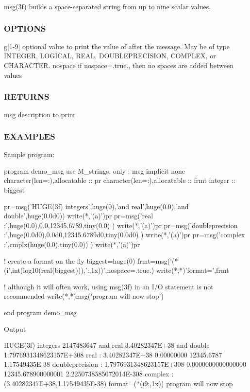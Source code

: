 msg(3f) builds a space-\/separated string from up to nine scalar values.

\subsubsection*{O\+P\+T\+I\+O\+NS}

g\mbox{[}1-\/9\mbox{]} optional value to print the value of after the message. May be of type I\+N\+T\+E\+G\+ER, L\+O\+G\+I\+C\+AL, R\+E\+AL, D\+O\+U\+B\+L\+E\+P\+R\+E\+C\+I\+S\+I\+ON, C\+O\+M\+P\+L\+EX, or C\+H\+A\+R\+A\+C\+T\+ER. nospace if nospace=.true., then no spaces are added between values \subsubsection*{R\+E\+T\+U\+R\+NS}

msg description to print

\subsubsection*{E\+X\+A\+M\+P\+L\+ES}

Sample program\+: \begin{DoxyVerb} program demo_msg
 use M_strings, only : msg
 implicit none
 character(len=:),allocatable :: pr
 character(len=:),allocatable :: frmt
 integer                      :: biggest

 pr=msg('HUGE(3f) integers',huge(0),'and real',huge(0.0),'and double',huge(0.0d0))
 write(*,'(a)')pr
 pr=msg('real            :',huge(0.0),0.0,12345.6789,tiny(0.0) )
 write(*,'(a)')pr
 pr=msg('doubleprecision :',huge(0.0d0),0.0d0,12345.6789d0,tiny(0.0d0) )
 write(*,'(a)')pr
 pr=msg('complex         :',cmplx(huge(0.0),tiny(0.0)) )
 write(*,'(a)')pr

 ! create a format on the fly
 biggest=huge(0)
 frmt=msg('(*(i',int(log10(real(biggest))),':,1x))',nospace=.true.)
 write(*,*)'format=',frmt

 ! although it will often work, using msg(3f) in an I/O statement is not recommended
 write(*,*)msg('program will now stop')

 end program demo_msg
\end{DoxyVerb}


Output \begin{DoxyVerb}HUGE(3f) integers 2147483647 and real 3.40282347E+38 and double 1.7976931348623157E+308
real            : 3.40282347E+38 0.00000000 12345.6787 1.17549435E-38
doubleprecision : 1.7976931348623157E+308 0.0000000000000000 12345.678900000001 2.2250738585072014E-308
complex         : (3.40282347E+38,1.17549435E-38)
 format=(*(i9:,1x))
 program will now stop
\end{DoxyVerb}


